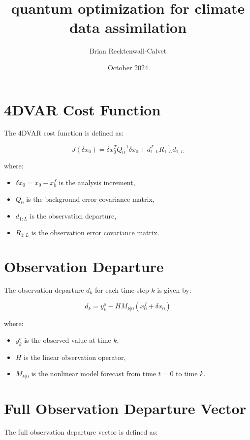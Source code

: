 \documentclass{article}
\title{quantum optimization for climate data assimilation}
\author{Brian Recktenwall-Calvet}
\date{October 2024}
\begin{document}
\maketitle
\section{4DVAR Cost Function}

The 4DVAR cost function is defined as:

\begin{equation}
J(\delta x_0) = \delta x_0^T Q_0^{-1} \delta x_0 + d_{1:L}^T R_{1:L}^{-1} d_{1:L}
\end{equation}

where:
\begin{itemize}
    \item \( \delta x_0 = x_0 - x^f_0 \) is the analysis increment,
    \item \( Q_0 \) is the background error covariance matrix,
    \item \( d_{1:L} \) is the observation departure,
    \item \( R_{1:L} \) is the observation error covariance matrix.
\end{itemize}

\section{Observation Departure}

The observation departure \( d_k \) for each time step \( k \) is given by:

\begin{equation}
d_k = y^o_k - H M_{k|0}(x^f_0 + \delta x_0)
\end{equation}

where:
\begin{itemize}
    \item \( y^o_k \) is the observed value at time \( k \),
    \item \( H \) is the linear observation operator,
    \item \( M_{k|0} \) is the nonlinear model forecast from time \( t=0 \) to time \( k \).
\end{itemize}

\section{Full Observation Departure Vector}

The full observation departure vector is defined as:
\end{document}
